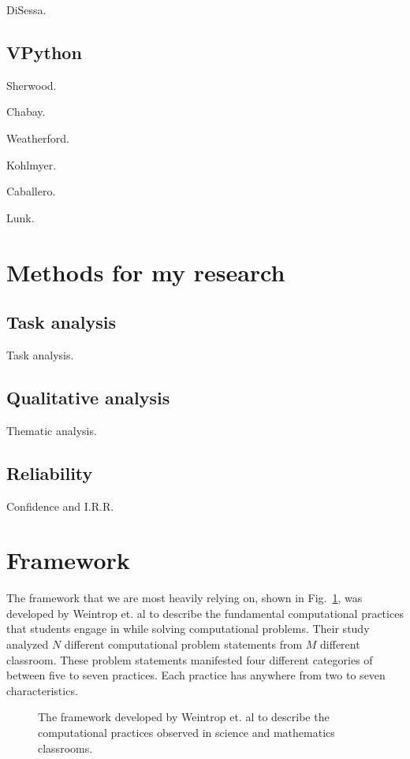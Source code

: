 \documentclass{msuphddissertation}
\begin{document}
\begin{doublespace}
DiSessa.

\subsection{VPython}

Sherwood.

Chabay.

Weatherford.

Kohlmyer.

Caballero.

Lunk.

\section{Methods for my research}

\subsection{Task analysis}

Task analysis.

\subsection{Qualitative analysis}

Thematic analysis.

\subsection{Reliability}

Confidence and I.R.R.

\section{Framework}

The framework that we are most heavily relying on, shown in Fig.~\ref{CH2:Framework}, was developed by Weintrop et. al to describe the fundamental computational practices that students engage in while solving computational problems.  Their study analyzed $N$ different computational problem statements from $M$ different classroom.  These problem statements manifested four different categories of between five to seven practices.  Each practice has anywhere from two to seven characteristics.

\begin{figure}
\caption{The framework developed by Weintrop et. al to describe the computational practices observed in science and mathematics classrooms.}\label{CH2:Framework}
\end{figure}


\end{doublespace}
\end{document}
